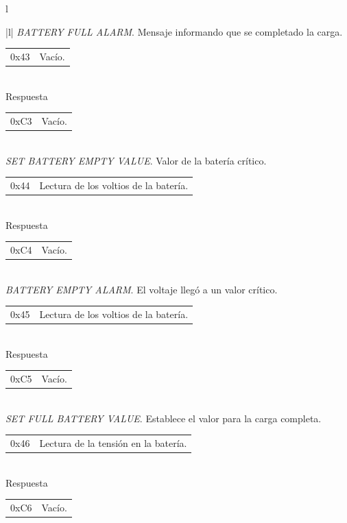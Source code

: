 \begin{table}
\begin{center}
\begin{tabular}{l}
\begin{tabular}{|l|}
				\hline\hline
				\emph{BATTERY FULL ALARM}. Mensaje informando que se completado la carga. \\
				\hline
				\begin{tabular}{c|l}
					0x43 & Vac\'io. \\
				\end{tabular}
				\\
				\hline
				Respuesta \\
				\hline
				\begin{tabular}{c|l}
					0xC3 & Vac\'io.\\
				\end{tabular}
				\\
	
				\hline\hline
				\emph{SET BATTERY EMPTY VALUE}. Valor de la bater\'ia cr\'itico. \\
				\hline
				\begin{tabular}{c|l}
					0x44 & Lectura de los voltios de la bater\'ia. \\
				\end{tabular}
				\\
				\hline
				Respuesta \\
				\hline
				\begin{tabular}{c|l}
					0xC4 & Vac\'io. \\
				\end{tabular}
				\\
	
				\hline\hline
				\emph{BATTERY EMPTY ALARM}. El voltaje lleg\'o a un valor cr\'itico. \\
				\hline
				\begin{tabular}{c|l}
					0x45 & Lectura de los voltios de la bater\'ia. \\
				\end{tabular}
				\\
				\hline
				Respuesta \\
				\hline
				\begin{tabular}{c|l}
					0xC5 & Vac\'io. \\
				\end{tabular}
				\\
	
				\hline\hline
				\emph{SET FULL BATTERY VALUE}. Establece el valor para la carga completa. \\
				\hline
				\begin{tabular}{c|l}
					0x46 & Lectura de la tensi\'on en la bater\'ia. \\
				\end{tabular}
				\\
				\hline
				Respuesta \\
				\hline
				\begin{tabular}{c|l}
					0xC6 & Vac\'io. \\
				\end{tabular}
				\\
	

\end{tabular}
\end{tabular}
\end{center}
\end{table}
